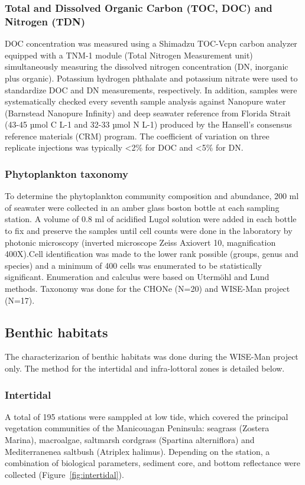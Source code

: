 \documentclass[essd, manuscript]{copernicus}
\begin{document}
\subsubsection{Total and Dissolved Organic Carbon (TOC, DOC) and Nitrogen (TDN)}
DOC concentration was measured using a Shimadzu TOC-Vcpn carbon analyzer equipped with a TNM-1 module (Total Nitrogen Measurement unit) simultaneously measuring the dissolved nitrogen concentration (DN, inorganic plus organic). Potassium hydrogen phthalate and potassium nitrate were used to standardize DOC and DN measurements, respectively. In addition, samples were systematically checked every seventh sample analysis against Nanopure water (Barnstead Nanopure Infinity) and deep seawater reference from Florida Strait (43-45 µmol C L-1 and 32-33 µmol N L-1) produced by the Hansell’s consensus reference materials (CRM) program. The coefficient of variation on three replicate injections was typically <2\% for DOC and <5\% for DN.

\subsubsection{Phytoplankton taxonomy}
To determine the phytoplankton community composition and abundance, 200 ml of seawater were collected in an amber glass boston bottle at each sampling station. A volume of 0.8 ml of acidified Lugol solution were added in each bottle to fix and preserve the samples until cell counts were done in the laboratory by photonic microscopy (inverted microscope Zeiss Axiovert 10, magnification 400X).Cell identification was made to the lower rank possible (groups, genus and species) and a minimum of 400 cells was enumerated to be statistically significant. Enumeration and calculus were based on Utermöhl and Lund methods. Taxonomy was done for the CHONe (N=20) and WISE-Man project (N=17).

\subsection{Benthic habitats} \label{benthos}
The characterizarion of benthic habitats was done during the WISE-Man project only. The method for the intertidal and infra-lottoral zones is detailed below.
\subsubsection{Intertidal}
A total of 195 stations were samppled at low tide, which covered the principal vegetation communities of the Manicouagan Peninsula: seagrass (Zostera Marina), macroalgae, saltmarsh cordgrass (Spartina alterniflora) and Mediterranenea saltbush (Atriplex halimus). Depending on the station, a combination of biological parameters, sediment core, and bottom reflectance were collected (Figure~\ref{fig:intertidal}).
\end{document}
